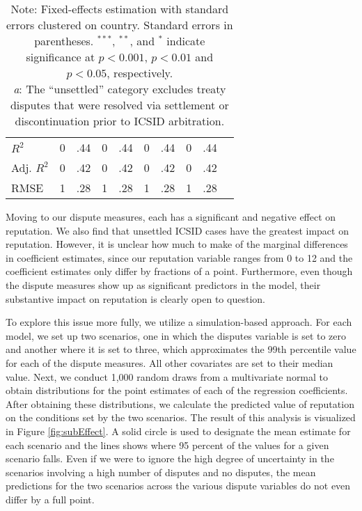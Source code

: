\documentclass[12pt,onesided]{amsart}
\begin{document}
\begin{savenotes}
\begin{table}[ht]
\begin{tabular}{lr@{} lr@{}lr@{}lr@{}lr@{}}
  $R^{2}$ & 0&.44 & 0&.44 & 0&.44 & 0&.44 \\ 
  Adj. $R^{2}$ & 0&.42 & 0&.42 & 0&.42 & 0&.42 \\ 
  RMSE & 1&.28 & 1&.28 & 1&.28 & 1&.28 \\ 
   \hline\hline
\end{tabular}
\caption*{Note: Fixed-effects estimation with standard errors clustered on country. Standard errors in parentheses. $^{***}$, $^{**}$, and $^{*}$ indicate significance at $p<0.001$, $p<0.01$ and $p<0.05$, respectively. \\ \textit{a}: The ``unsettled'' category excludes treaty disputes that were resolved via settlement or discontinuation prior to ICSID arbitration.}
\end{table}
\end{savenotes}


Moving to our dispute measures, each has a significant and negative effect on reputation. We also find that unsettled ICSID cases have the greatest impact on reputation. However, it is unclear how much to make of the marginal differences in coefficient estimates, since our reputation variable ranges from 0 to 12 and the coefficient estimates only differ by fractions of a point. Furthermore, even though the dispute measures show up as significant predictors in the model, their substantive impact on reputation is clearly open to question. 

To explore this issue more fully, we utilize a simulation-based approach. For each model, we set up two scenarios, one in which the disputes variable is set to zero and another where it is set to three, which approximates the 99th percentile value for each of the dispute measures. All other covariates are set to their median value. Next, we conduct 1,000 random draws from a multivariate normal to obtain distributions for the point estimates of each of the regression coefficients. After obtaining these distributions, we calculate the predicted value of reputation on the conditions set by the two scenarios. The result of this analysis is visualized in Figure \ref{fig:subEffect}. A solid circle is used to designate the mean estimate for each scenario and the lines shows where 95 percent of the values for a given scenario falls. Even if we were to ignore the high degree of uncertainty in the scenarios involving a high number of disputes and no disputes, the mean predictions for the two scenarios across the various dispute variables do not even differ by a full point. 
\end{document}
